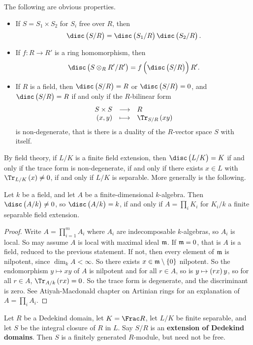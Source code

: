 The following are obvious properties.
\begin{itemize}
\item If $ S = S_1 \times S_2 $ for $ S_i $ free over $ R $, then
$$ \disc\br{S / R} = \disc\br{S_1 / R}\disc\br{S_2 / R}. $$
\item If $ f : R \to R' $ is a ring homomorphism, then
$$ \disc\br{S \otimes_R R' / R'} = f\br{\disc\br{S / R}}R'. $$
\item If $ R $ is a field, then $ \disc\br{S / R} = R $ or $ \disc\br{S / R} = 0 $, and $ \disc\br{S / R} = R $ if and only if the $ R $-bilinear form
$$ \function{S \times S}{R}{\br{x, y}}{\Tr_{S / R}\br{xy}} $$
is non-degenerate, that is there is a duality of the $ R $-vector space $ S $ with itself.
\end{itemize}
By field theory, if $ L / K $ is a finite field extension, then $ \disc\br{L / K} = K $ if and only if the trace form is non-degenerate, if and only if there exists $ x \in L $ with $ \Tr_{L / K}\br{x} \ne 0 $, if and only if $ L / K $ is separable. More generally is the following.

\begin{theorem}
\label{thm:3.1}
Let $ k $ be a field, and let $ A $ be a finite-dimensional $ k $-algebra. Then $ \disc\br{A / k} \ne 0 $, so $ \disc\br{A / k} = k $, if and only if $ A = \prod_i K_i $ for $ K_i / k $ a finite separable field extension.
\end{theorem}

\begin{proof}
Write $ A = \prod_{i = 1}^m A_i $ where $ A_i $ are indecomposable $ k $-algebras, so $ A_i $ is local. So may assume $ A $ is local with maximal ideal $ \mathfrak{m} $. If $ \mathfrak{m} = 0 $, that is $ A $ is a field, reduced to the previous statement. If not, then every element of $ \mathfrak{m} $ is nilpotent, since $ \dim_k A < \infty $. So there exists $ x \in \mmm \setminus \cbr{0} $ nilpotent. So the endomorphism $ y \mapsto xy $ of $ A $ is nilpotent and for all $ r \in A $, so is $ y \mapsto \br{rx}y $, so for all $ r \in A $, $ \Tr_{A / k}\br{rx} = 0 $. So the trace form is degenerate, and the discriminant is zero. See Atiyah-Macdonald chapter on Artinian rings for an explanation of $ A = \prod_i A_i $.
\end{proof}


Let $ R $ be a Dedekind domain, let $ K = \Frac R $, let $ L / K $ be finite separable, and let $ S $ be the integral closure of $ R $ in $ L $. Say $ S / R $ is an \textbf{extension of Dedekind domains}. Then $ S $ is a finitely generated $ R $-module, but need not be free.

